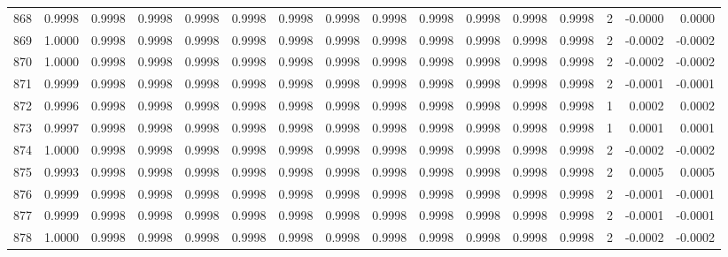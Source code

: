 \begin{tabular}{lrrrrrrrrrrrrrrr}
868 &      0.9998 &  0.9998 &  0.9998 &  0.9998 &  0.9998 &  0.9998 &  0.9998 &  0.9998 &  0.9998 &  0.9998 &   0.9998 &     0.9998 &      2 &                   -0.0000 &                     0.0000 \\
869 &      1.0000 &  0.9998 &  0.9998 &  0.9998 &  0.9998 &  0.9998 &  0.9998 &  0.9998 &  0.9998 &  0.9998 &   0.9998 &     0.9998 &      2 &                   -0.0002 &                    -0.0002 \\
870 &      1.0000 &  0.9998 &  0.9998 &  0.9998 &  0.9998 &  0.9998 &  0.9998 &  0.9998 &  0.9998 &  0.9998 &   0.9998 &     0.9998 &      2 &                   -0.0002 &                    -0.0002 \\
871 &      0.9999 &  0.9998 &  0.9998 &  0.9998 &  0.9998 &  0.9998 &  0.9998 &  0.9998 &  0.9998 &  0.9998 &   0.9998 &     0.9998 &      2 &                   -0.0001 &                    -0.0001 \\
872 &      0.9996 &  0.9998 &  0.9998 &  0.9998 &  0.9998 &  0.9998 &  0.9998 &  0.9998 &  0.9998 &  0.9998 &   0.9998 &     0.9998 &      1 &                    0.0002 &                     0.0002 \\
873 &      0.9997 &  0.9998 &  0.9998 &  0.9998 &  0.9998 &  0.9998 &  0.9998 &  0.9998 &  0.9998 &  0.9998 &   0.9998 &     0.9998 &      1 &                    0.0001 &                     0.0001 \\
874 &      1.0000 &  0.9998 &  0.9998 &  0.9998 &  0.9998 &  0.9998 &  0.9998 &  0.9998 &  0.9998 &  0.9998 &   0.9998 &     0.9998 &      2 &                   -0.0002 &                    -0.0002 \\
875 &      0.9993 &  0.9998 &  0.9998 &  0.9998 &  0.9998 &  0.9998 &  0.9998 &  0.9998 &  0.9998 &  0.9998 &   0.9998 &     0.9998 &      2 &                    0.0005 &                     0.0005 \\
876 &      0.9999 &  0.9998 &  0.9998 &  0.9998 &  0.9998 &  0.9998 &  0.9998 &  0.9998 &  0.9998 &  0.9998 &   0.9998 &     0.9998 &      2 &                   -0.0001 &                    -0.0001 \\
877 &      0.9999 &  0.9998 &  0.9998 &  0.9998 &  0.9998 &  0.9998 &  0.9998 &  0.9998 &  0.9998 &  0.9998 &   0.9998 &     0.9998 &      2 &                   -0.0001 &                    -0.0001 \\
878 &      1.0000 &  0.9998 &  0.9998 &  0.9998 &  0.9998 &  0.9998 &  0.9998 &  0.9998 &  0.9998 &  0.9998 &   0.9998 &     0.9998 &      2 &                   -0.0002 &                    -0.0002 \\

\end{tabular}
